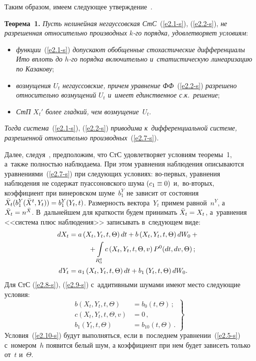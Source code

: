 \begin{multicols}{2}
Таким образом, имеем следующее утверждение~\cite{8-s}.

\smallskip

\noindent
\textbf{Теорема~1.} \textit{Пусть нелинейная негауссовская СтС}~(\ref{e2.1-s}), (\ref{e2.2-s}), 
\textit{не разрешенная относительно производных $k$-го порядка, удовлетворяет условиям}:
\begin{itemize}
\item[1$^\circ$]
\textit{функции}~(\ref{e2.1-s}) \textit{допускают обобщенные стохастические дифференциалы Ито 
вплоть до $h$-го порядка включительно и~статистическую линеаризацию по Казакову};
\item[2$^\circ$]
\textit{возмущения $U_t$ негауссовские, причем уравнение ФФ}~(\ref{e2.2-s}) 
\textit{разрешено относительно возмущений $U_t$ и~имеет единственное с.к.\ решение};
\item[3$^\circ$]
\textit{СтП $X_t'$ более гладкий, чем возмущение~$U_t$}.
\end{itemize}
\textit{Тогда система}~(\ref{e2.1-s}), (\ref{e2.2-s}) 
\textit{приводима к~дифференциальной системе, разрешенной относительно производных}~(\ref{e2.7-s}).

\smallskip

Далее, следуя~\cite{10-s}, предположим, что СтС удовле\-тво\-ря\-ет условиям теоремы~1, 
а~также пол\-ностью наблюдаема. При этом уравнения наблюдения описыва\-ют\-ся уравнениями~(\ref{e2.7-s}) 
при сле\-ду\-ющих условиях: во-пер\-вых, уравнения наблюдения не содержат пуассоновского шума 
 $(c_1\hm\equiv 0)$ и,~во-вто\-рых, коэффициент при винеровском шуме~$b_1^Y$ не зависит от состояния  
 ${\bar X}_t (b_1^Y ({\bar X}^t, Y_t))\hm = b_1^Y (Y_t, t)$. Размерность вектора~$Y_t$ примем равной~$n^Y$, 
 а~${\bar X}_t \hm= n^{\bar X}$.
В~дальнейшем для краткости будем принимать ${\bar X}_t \hm= X_t$, а~уравнения 
<<система плюс наблюдения>> записывать в~сле\-ду\-ющем виде:
\begin{align}
dX_t &= a \left(X_t, Y_t, t, \Theta\right) dt + b\left(X_t, Y_t, t, \Theta\right) dW_0 + {}\notag\\
&\hspace*{10mm}{}+ \int\limits_{R_0^q} c \left(X_t, Y_t, t, \Theta,v\right)P^0 (dt, dv, \Theta)\,;\label{e2.8-s}
\\
    dY_t &= a_1 \left(X_t, Y_t, t, \Theta\right)dt + b_1 \left( Y_t, t, \Theta\right)dW_0.\label{e2.9-s}
    \end{align}
Для  СтС (\ref{e2.8-s}), (\ref{e2.9-s}) с~аддитивными шумами имеют место следующие условия:
\begin{equation}
\left.
\begin{array}{rl}
b\left(X_t, Y_t, t, \Theta\right) &= b_0 ( t, \Theta)\,; \\[6pt] 
c\left(X_t, Y_t, t, \Theta,v\right)&=0\,,\\[6pt] 
b_1 \left( Y_t, t, \Theta\right)&=b_{10}(t,\Theta)\,.
\end{array}
\right\}
\label{e2.10-s}
\end{equation}
Условия~(\ref{e2.10-s}) будут выполняться, если в~последнем уравнении~(\ref{e2.5-s}) с~номером~$h$ 
появится белый шум, а коэффициент при нем будет зависеть только от~$t$ и~$\Theta$.



\end{multicols}
